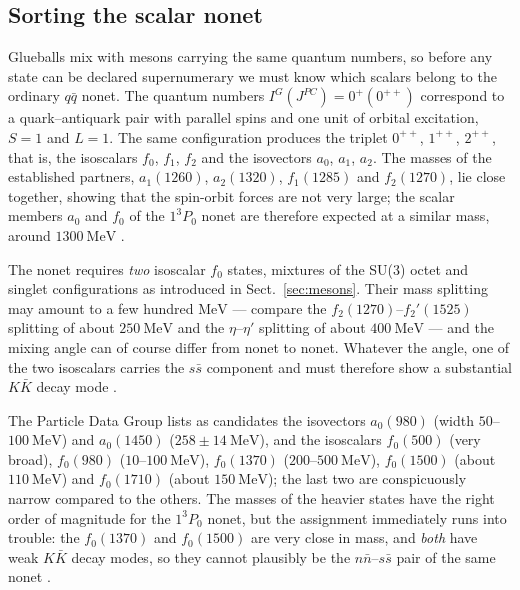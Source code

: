 \FloatBarrier

\subsection{Sorting the scalar nonet}
\label{subsec:scalar_nonet}

Glueballs mix with mesons carrying the same quantum numbers, so before any state
can be declared supernumerary we must know which scalars belong to the ordinary
$q\bar q$ nonet. The quantum numbers $I^{G}(J^{PC})=0^{+}(0^{++})$ correspond to a
quark--antiquark pair with parallel spins and one unit of orbital excitation,
$S=1$ and $L=1$. The same configuration produces the triplet
$0^{++}$, $1^{++}$, $2^{++}$, that is, the isoscalars $f_0$, $f_1$, $f_2$ and the
isovectors $a_0$, $a_1$, $a_2$. The masses of the established partners,
$a_1(1260)$, $a_2(1320)$, $f_1(1285)$ and $f_2(1270)$, lie close together, showing
that the spin-orbit forces are not very large; the scalar members $a_0$ and $f_0$
of the $1^3P_0$ nonet are therefore expected at a similar mass, around
$1300~\mathrm{MeV}$ \cite[Ch.~5]{Amsler2018}.

The nonet requires \emph{two} isoscalar $f_0$ states, mixtures of the SU(3) octet
and singlet configurations as introduced in Sect.~\ref{sec:mesons}. Their mass
splitting may amount to a few hundred $\mathrm{MeV}$ --- compare the
$f_2(1270)$--$f_2'(1525)$ splitting of about $250~\mathrm{MeV}$ and the
$\eta$--$\eta'$ splitting of about $400~\mathrm{MeV}$ --- and the mixing angle can
of course differ from nonet to nonet. Whatever the angle, one of the two
isoscalars carries the $s\bar s$ component and must therefore show a substantial
$K\bar K$ decay mode \cite[Ch.~5]{Amsler2018}.

The Particle Data Group lists as candidates the isovectors $a_0(980)$
(width $50$--$100~\mathrm{MeV}$) and $a_0(1450)$ ($258\pm14~\mathrm{MeV}$), and
the isoscalars $f_0(500)$ (very broad), $f_0(980)$ ($10$--$100~\mathrm{MeV}$),
$f_0(1370)$ ($200$--$500~\mathrm{MeV}$), $f_0(1500)$ (about $110~\mathrm{MeV}$)
and $f_0(1710)$ (about $150~\mathrm{MeV}$); the last two are conspicuously narrow
compared to the others. The masses of the heavier states have the right order of
magnitude for the $1^3P_0$ nonet, but the assignment immediately runs into
trouble: the $f_0(1370)$ and $f_0(1500)$ are very close in mass, and \emph{both}
have weak $K\bar K$ decay modes, so they cannot plausibly be the
$n\bar n$--$s\bar s$ pair of the same nonet \cite[Ch.~11]{Amsler2018}.

